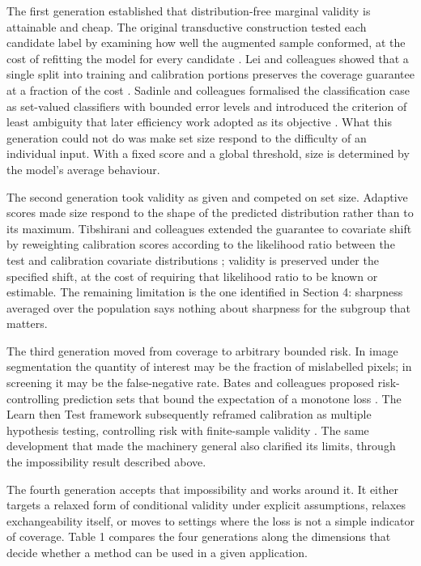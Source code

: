 The first generation established that distribution-free marginal validity is
attainable and cheap. The original transductive construction tested each candidate
label by examining how well the augmented sample conformed, at the cost of
refitting the model for every candidate \cite{Vovk2005}. Lei and colleagues showed
that a single split into training and calibration portions preserves the coverage
guarantee at a fraction of the cost \cite{Lei2018}. Sadinle and colleagues
formalised the classification case as set-valued classifiers with bounded error
levels and introduced the criterion of least ambiguity that later efficiency work
adopted as its objective \cite{Sadinle2019}. What this generation could not do was
make set size respond to the difficulty of an individual input. With a fixed score
and a global threshold, size is determined by the model's average behaviour.

The second generation took validity as given and competed on set size. Adaptive
scores made size respond to the shape of the predicted distribution rather than to
its maximum. Tibshirani and colleagues extended the guarantee to covariate shift
by reweighting calibration scores according to the likelihood ratio between the
test and calibration covariate distributions \cite{Tibshirani2019}; validity is
preserved under the specified shift, at the cost of requiring that likelihood
ratio to be known or estimable. The remaining limitation is the one identified in
Section 4: sharpness averaged over the population says nothing about sharpness for
the subgroup that matters.

The third generation moved from coverage to arbitrary bounded risk. In image
segmentation the quantity of interest may be the fraction of mislabelled pixels; in
screening it may be the false-negative rate. Bates and colleagues proposed
risk-controlling prediction sets that bound the expectation of a monotone loss
\cite{Bates2021}. The Learn then Test framework subsequently reframed calibration
as multiple hypothesis testing, controlling risk with finite-sample validity
\cite{LTT}. The same development that made the machinery general also
clarified its limits, through the impossibility result described above.

The fourth generation accepts that impossibility and works around it. It either
targets a relaxed form of conditional validity under explicit assumptions, relaxes
exchangeability itself, or moves to settings where the loss is not a simple
indicator of coverage. Table 1 compares the four generations along the dimensions
that decide whether a method can be used in a given application.

